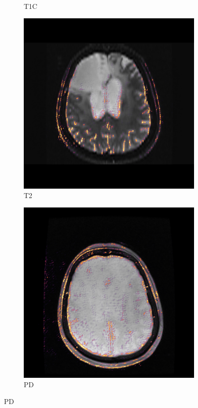 \begin{figure}[htbp]
\begin{subfigure}[t]{\figexamplewidth}
        \caption{\gls{T1C}}\label{fig:T1GDCam}
    \end{subfigure}
    \begin{subfigure}[t]{\figexamplewidth}
        \centering
        \includegraphics[trim={0.5cm 0cm 0.5cm 1cm}, clip,width=\textwidth]{Figures/T2_saliency}
        \caption{\gls{T2}}\label{fig:T2wCam}
    \end{subfigure}
    \begin{subfigure}[t]{\figexamplewidth}
        \centering
        \includegraphics[trim={0.5cm 0cm 0.5cm 1cm}, clip,width=\textwidth]{Figures/PD_saliency}
        \caption{\gls{PD}}\label{fig:PDwCam}
    \end{subfigure}



\end{figure}

